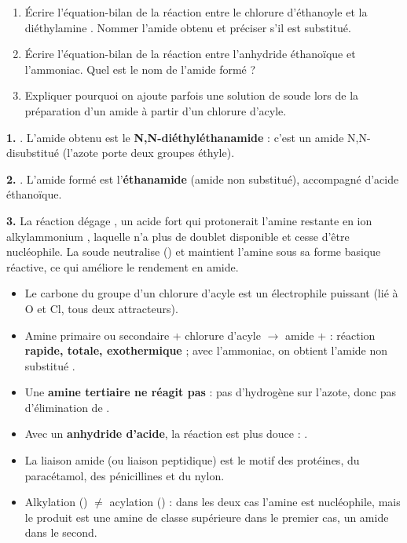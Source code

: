 \documentclass[11pt]{article}
\newcommand{\cle}[1]{{\popxbold\color{popdark}#1}}
\begin{document}
\begin{exercice}
\begin{enumerate}
\item Écrire l'équation-bilan de la réaction entre le chlorure d'éthanoyle et la diéthylamine . Nommer l'amide obtenu et préciser s'il est substitué.
\item Écrire l'équation-bilan de la réaction entre l'anhydride éthanoïque et l'ammoniac. Quel est le nom de l'amide formé ?
\item Expliquer pourquoi on ajoute parfois une solution de soude lors de la préparation d'un amide à partir d'un chlorure d'acyle.
\end{enumerate}
\end{exercice}

\begin{corrige}[Exercice]
\textbf{1.} . L'amide obtenu est le \textbf{N,N-diéthyléthanamide} : c'est un amide N,N-disubstitué (l'azote porte deux groupes éthyle).

\textbf{2.} . L'amide formé est l'\textbf{éthanamide} (amide non substitué), accompagné d'acide éthanoïque.

\textbf{3.} La réaction dégage , un acide fort qui protonerait l'amine restante en ion alkylammonium , laquelle n'a plus de doublet disponible et cesse d'être nucléophile. La soude neutralise  () et maintient l'amine sous sa forme basique réactive, ce qui améliore le rendement en amide.
\end{corrige}

\begin{aretenir}
\begin{itemize}
\item Le carbone du groupe  d'un chlorure d'acyle  est un \cle{électrophile} puissant (lié à O et Cl, tous deux attracteurs).
\item Amine primaire ou secondaire + chlorure d'acyle $\rightarrow$ \cle{amide} +  : réaction \textbf{rapide, totale, exothermique} ; avec l'ammoniac, on obtient l'amide non substitué .
\item Une \textbf{amine tertiaire ne réagit pas} : pas d'hydrogène sur l'azote, donc pas d'élimination de .
\item Avec un \textbf{anhydride d'acide}, la réaction est plus douce : .
\item La \cle{liaison amide}  (ou liaison peptidique) est le motif des protéines, du paracétamol, des pénicillines et du nylon.
\item Alkylation () $\neq$ acylation () : dans les deux cas l'amine est nucléophile, mais le produit est une amine de classe supérieure dans le premier cas, un amide dans le second.
\end{itemize}
\end{aretenir}
\end{document}
